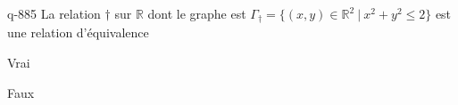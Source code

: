 \begin{truefalse}{q-885}
La relation $\dagger$ sur $\mathbb R$ dont le graphe est $\Gamma_\dagger=\{(x,y)\in\mathbb R^2\:|\: x^2+y^2\leq 2\}$ est une relation d'équivalence
\item Vrai
\item* Faux
\end{truefalse}

